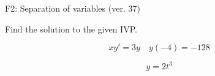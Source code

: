 \begin{exercise}
  \begin{exerciseTitle}F2: Separation of variables (ver. 37)\end{exerciseTitle}
  \begin{exerciseStatement}
    
Find the solution to the given IVP.

    
\[xy'= 3 y \hspace{1em} y( -4 ) = -128\]

  \end{exerciseStatement}
  \begin{exerciseAnswer}
    
\[y= 2 t^ 3\]

  \end{exerciseAnswer}
\end{exercise}